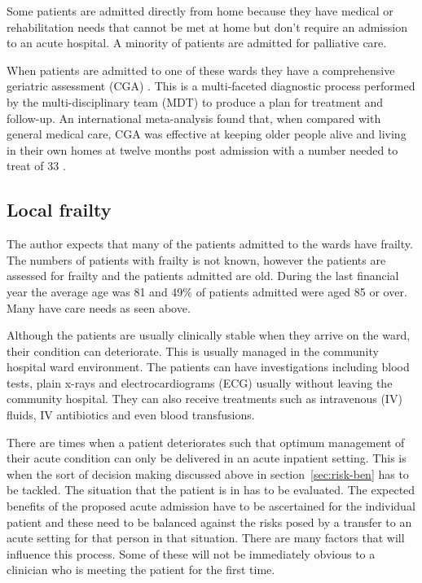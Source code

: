 \documentclass
[
	12pt,
	a4paper,
	oneside,
]{report}
\begin{document}
Some patients are admitted directly from home because they have medical or rehabilitation
needs that cannot be met at home but don't require an admission to an acute hospital.
A minority of patients are admitted for palliative care.

When patients are admitted to one of these wards they have a comprehensive geriatric 
assessment (CGA) \parencite{bgs:14}. This is a multi-faceted diagnostic process
performed by the multi-disciplinary team (MDT) to produce a plan for treatment 
and follow-up.
An international meta-analysis found that, when compared with general medical care,
CGA was effective at keeping older people alive and living in their own homes at
twelve months post admission with a number needed to treat of 33 \parencite{ellis:11}.

\subsection{Local frailty}

The author expects that many of the patients admitted to the wards have frailty.
The numbers of patients with frailty is not known, however the patients are assessed 
for frailty and the patients admitted are old. During the last financial year the
average age was 81 and 49\% of patients admitted were aged 85 or over. Many have 
care needs as seen above.

Although the patients are usually clinically stable when they arrive on the ward,
their condition can deteriorate. This is usually managed in the community hospital
ward environment. The patients can have investigations including blood tests, plain
x-rays and electrocardiograms (ECG) usually without leaving the community hospital.
They can also receive treatments such as intravenous (IV) fluids, IV antibiotics
and even blood transfusions.

There are times when a patient deteriorates such that optimum management of their
acute condition can only be delivered in an acute inpatient setting. This is when 
the sort of decision making discussed above in section~\ref{sec:risk-ben} has
to be tackled. The situation that the patient is in has to be evaluated. The 
expected benefits of the proposed acute admission have to be ascertained for the
individual patient and these need to be balanced against the risks posed by a transfer
to an acute setting for that person in that situation. There are many factors that 
will influence this process. Some of these will not be immediately obvious to a 
clinician who is meeting the patient for the first time.
\end{document}
